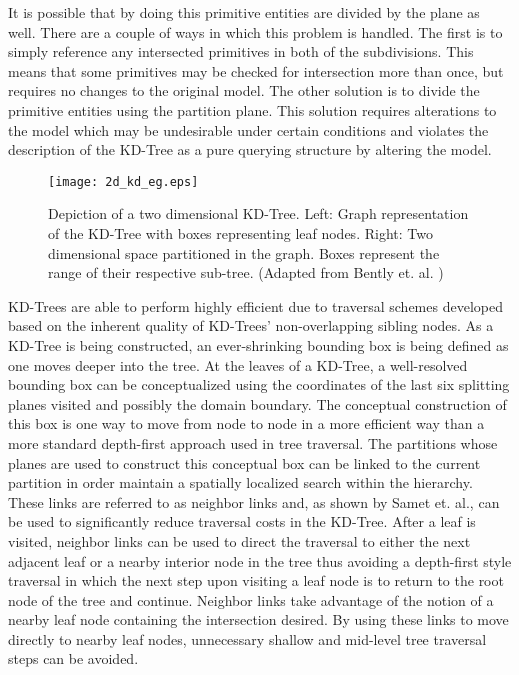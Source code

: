 It is possible that by doing this primitive
entities are divided by the plane as well. There are a couple of ways in which
this problem is handled. The first is to simply reference any intersected
primitives in both of the subdivisions. This means that some primitives may be
checked for intersection more than once, but requires no changes to the original
model. The other solution is to divide the primitive entities using the
partition plane.  This solution requires alterations to the model which may be
undesirable under certain conditions and violates the description of the KD-Tree
as a pure querying structure by altering the model.

\begin{figure}[H]
  \centering
  \texttt{[image: 2d\_kd\_eg.eps]}
  \caption[A 2D KD-Tree example.]{Depiction of a two dimensional KD-Tree. Left: Graph representation of
    the KD-Tree with boxes representing leaf nodes. Right: Two dimensional space
    partitioned in the graph. Boxes represent the range of their respective
    sub-tree. (Adapted from Bently et. al. \cite{Bentley_1975})}
  \label{fig:2D_kd_tree}
\end{figure}

KD-Trees are able to perform highly efficient due to traversal schemes developed
based on the inherent quality of KD-Trees' non-overlapping sibling nodes. As a
KD-Tree is being constructed, an ever-shrinking bounding box is being defined as
one moves deeper into the tree. At the leaves of a KD-Tree, a well-resolved
bounding box can be conceptualized using the coordinates of the last six
splitting planes visited and possibly the domain boundary. The conceptual
construction of this box is one way to move from node to node in a more
efficient way than a more standard depth-first approach used in tree
traversal. The partitions whose planes are used to construct this conceptual box
can be linked to the current partition in order maintain a spatially localized
search within the hierarchy. These links are referred to as neighbor links and,
as shown by Samet et. al.\cite{Samet_1989}, can be used to significantly reduce
traversal costs in the KD-Tree. After a leaf is visited, neighbor links can be
used to direct the traversal to either the next adjacent leaf or a nearby
interior node in the tree thus avoiding a depth-first style traversal in which
the next step upon visiting a leaf node is to return to the root node of the
tree and continue. Neighbor links take advantage of the notion of a nearby leaf
node containing the intersection desired. By using these links to move directly
to nearby leaf nodes, unnecessary shallow and mid-level tree traversal steps can
be avoided.

